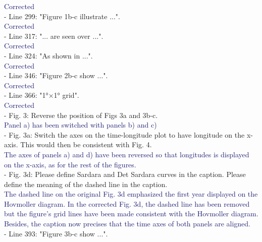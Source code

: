 \documentclass[12pt]{article}
\newcommand{\resp}[1]{\textcolor{MidnightBlue}{#1}}
\begin{document}
\resp{Corrected}\\

- Line 299: "Figure 1b-c illustrate ...".\\

\resp{Corrected}	\\

- Line 317: "... are seen over ...".\\

\resp{Corrected}\\

- Line 324: "As shown in ...". \\

\resp{Corrected}\\

- Line 346: "Figure 2b-c show ...".\\

\resp{Corrected}\\

- Line 366: "1°×1° grid".\\

\resp{Corrected} \\

- Fig. 3: Reverse the position of Figs 3a and 3b-c.\\

\resp{Panel a) has been switched with panels b) and c) } \\

- Fig. 3a: Switch the axes on the time-longitude plot to have longitude on the x-axis. This would then be consistent with Fig. 4.\\

\resp{The axes of panels a) and d) have been reversed so that longitudes is displayed on the x-axis, as for the rest of the figures.} \\

- Fig. 3d: Please define Sardara and Det Sardara curves in the caption. Please define the meaning of the dashed line in the caption.\\

\resp{The dashed line on the original Fig. 3d emphasized the first year displayed on the Hovmoller diagram. In the corrected Fig. 3d, the dashed line has been removed but the figure's grid lines have been made consistent with the Hovmoller diagram. Besides, the caption now precises that the time axes of both panels are aligned.} \\

- Line 393: "Figure 3b-c show ...".\\
\end{document}
